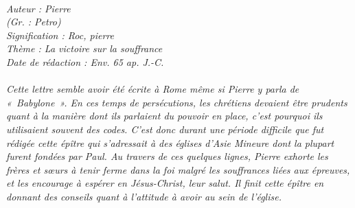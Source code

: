 \BFont
\noindent\hrulefill
{\footnotesize
\textit{
\bigskip
{\centering{}
\\Auteur : Pierre
\\(Gr. : Petro)
\\Signification : Roc, pierre
\\Thème : La victoire sur la souffrance
\\Date de rédaction : Env. 65 ap. J.-C.\\}
}
\textit{
\\Cette lettre semble avoir été écrite à Rome même si Pierre y parla de «~Babylone~». En ces temps de persécutions, les chrétiens devaient être prudents quant à la manière dont ils parlaient du pouvoir en place, c’est pourquoi ils utilisaient souvent des codes. C’est donc durant une période difficile que fut rédigée cette épître qui s’adressait à des églises d’Asie Mineure dont la plupart furent fondées par Paul. Au travers de ces quelques lignes, Pierre exhorte les frères et sœurs à tenir ferme dans la foi malgré les souffrances liées aux épreuves, et les encourage à espérer en Jésus-Christ, leur salut. Il finit cette épître en donnant des conseils quant à l’attitude à avoir au sein de l’église.\bigskip
}
}
\par\nobreak\noindent\hrulefill
